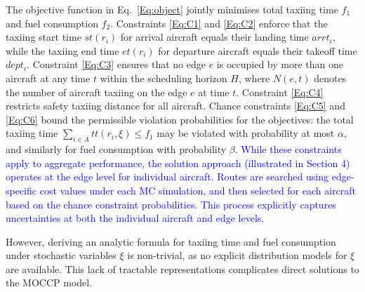 \documentclass{article}
\newcommand*{\blue}{\textcolor{blue}}
\begin{document}
The objective function in Eq.~\eqref{Eq:object} jointly minimises total taxiing time $f_{1}$ and fuel consumption $f_{2}$. Constraints \eqref{Eq:C1} and \eqref{Eq:C2} enforce that the taxiing start time $st(r_{i})$ for arrival aircraft equals their landing time $arrt_{i}$, while the taxiing end time $et(r_{i})$ for departure aircraft equals their takeoff time $dept_{i}$. Constraint \eqref{Eq:C3} ensures that no edge $e$ is occupied by more than one aircraft at any time $t$ within the scheduling horizon $H$, where $N(e, t)$ denotes the number of aircraft taxiing on the edge $e$ at time $t$. Constraint \eqref{Eq:C4} restricts safety taxiing distance for all aircraft. 
Chance constraints \eqref{Eq:C5} and \eqref{Eq:C6} bound the permissible violation probabilities for the objectives: the total taxiing time $\sum_{i \in A} tt\left(r_{i}, \xi\right) \leq f_{1}$ may be violated with probability at most $\alpha$, and similarly for fuel consumption with probability $\beta$. \blue{While these constraints apply to aggregate performance, the solution approach (illustrated in Section 4) operates at the edge level for individual aircraft. Routes are searched using edge-specific cost values under each MC simulation, and then selected for each aircraft based on the chance constraint probabilities. This process explicitly captures uncertainties at both the individual aircraft and edge levels.}

However, deriving an analytic formula for taxiing time and fuel consumption under stochastic variables $\xi$ is non-trivial, as no explicit distribution models for $\xi$ are available. This lack of tractable representations complicates direct solutions to the MOCCP model.
\end{document}
